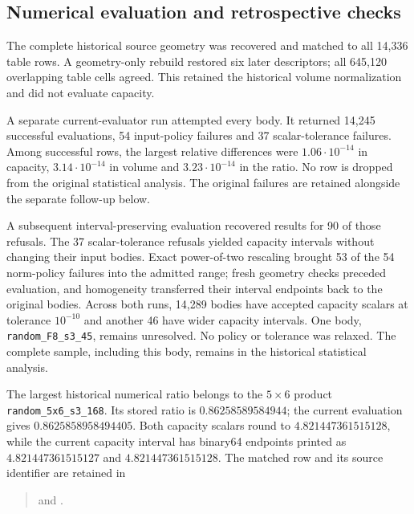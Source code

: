 \subsection{Numerical evaluation and retrospective checks}\label{app:ds-evaluation}

The complete historical source geometry was recovered and matched to all
14,336 table rows. A geometry-only rebuild restored six later descriptors;
all 645,120 overlapping table cells agreed. This retained the historical
volume normalization and did not evaluate capacity.

A separate current-evaluator run attempted every body. It returned 14,245
successful evaluations, 54 input-policy failures and 37 scalar-tolerance
failures. Among successful rows, the largest relative differences were
$1.06\cdot10^{-14}$ in capacity, $3.14\cdot10^{-14}$ in volume and
$3.23\cdot10^{-14}$ in the ratio. No row is dropped from the original
statistical analysis. The original failures are retained alongside the separate follow-up below.

A subsequent interval-preserving evaluation recovered results for 90 of
those refusals. The 37 scalar-tolerance refusals yielded capacity intervals
without changing their input bodies. Exact power-of-two rescaling brought
53 of the 54 norm-policy failures into the admitted range; fresh geometry
checks preceded evaluation, and homogeneity transferred their interval
endpoints back to the original bodies. Across both runs, 14,289 bodies have
accepted capacity scalars at tolerance $10^{-10}$ and another 46 have wider
capacity intervals. One body, \texttt{random\_F8\_s3\_45}, remains unresolved.
No policy or tolerance was relaxed. The complete sample, including this
body, remains in the historical statistical analysis.

The largest historical numerical ratio belongs to the $5\times6$ product
\texttt{random\_5x6\_s3\_168}. Its stored ratio is
$0.86258589584944$; the current evaluation gives
$0.8625858958494405$. Both capacity scalars round to
$4.821447361515128$, while the current capacity interval has binary64
endpoints printed as $4.821447361515127$ and $4.821447361515128$.
The matched row and its source identifier are retained in
\begin{quote}
\small\raggedright
{}
and .
\end{quote}

